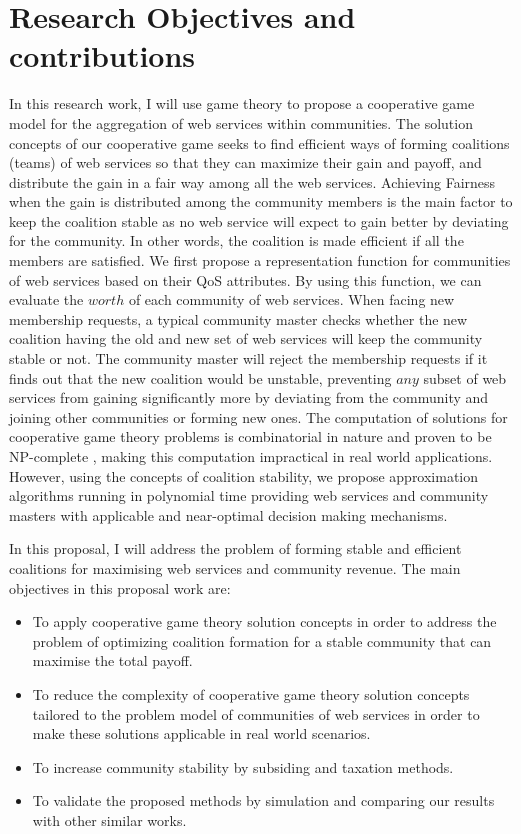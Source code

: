 \section{Research Objectives and contributions}\label{sec:motexample}

In this research work, I will use game theory to
propose a cooperative game model for the aggregation of web
services within communities. The solution concepts of our
cooperative game seeks to find efficient ways of forming
coalitions (teams) of web services so that they can maximize their
gain and payoff, and distribute the gain in a fair way among all
the web services. Achieving Fairness when the gain is distributed
among the community members is the main factor to keep the
coalition stable as no web service will expect to gain better by
deviating for the community. In other words, the coalition is made
efficient if all the members are satisfied. We first propose a
representation function for communities of web services based on
their QoS attributes. By using this function, we can evaluate the
$worth$ of each community of web services. When facing new
membership requests, a typical community master checks whether the
new coalition having the old and new set of web services will keep
the community stable or not. The community master will reject the
membership requests if it finds out that the new coalition would
be unstable, preventing $any$ subset of web services from gaining
significantly more by deviating from the community and joining
other communities or forming new ones. The computation of
solutions for cooperative game theory problems is combinatorial in
nature and proven to be NP-complete \cite{Algorithmic}, making
this computation impractical in real world applications. However,
using the concepts of coalition stability, we propose
approximation algorithms running in polynomial time providing web
services and community masters with applicable and near-optimal
decision making mechanisms.

\indent In this proposal, I will address the problem of forming stable and efficient coalitions for maximising web services and community revenue.
The main objectives in this proposal work are:
\begin{itemize}
\item To apply cooperative game theory solution concepts in order to address the problem of optimizing coalition formation for a stable community that can maximise the total payoff.
\item To reduce the complexity of cooperative game theory solution concepts tailored to the problem model of communities of web services in order to make these solutions applicable in real world scenarios.
\item To increase community stability by subsiding and taxation methods.
\item To validate the proposed methods by simulation and comparing our results with other similar works.
\end{itemize}




